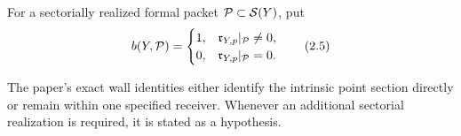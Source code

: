 \begin{definition}\label{def:boolean}
For a sectorially realized formal packet \(\mathcal P\subset\mathcal S(Y)\), put
\[
 b(Y,\mathcal P)=
 \begin{cases}
 1,&\mathfrak r_{Y,p}|_{\mathcal P}\ne0,\\
 0,&\mathfrak r_{Y,p}|_{\mathcal P}=0.
 \end{cases}                                                \tag{2.5}
\]
\end{definition}

The paper's exact wall identities either identify the intrinsic point
section directly or remain within one specified receiver.  Whenever an
additional sectorial realization is required, it is stated as a hypothesis.

